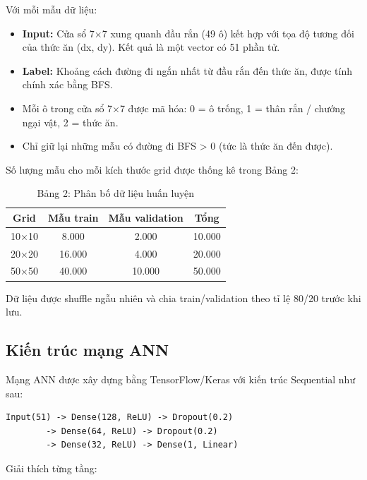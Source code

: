\documentclass[12pt,a4paper]{article}
\begin{document}
Với mỗi mẫu dữ liệu:

\begin{itemize}
    \item \textbf{Input:} Cửa sổ 7×7 xung quanh đầu rắn (49 ô) kết hợp với tọa độ tương đối của thức ăn (dx, dy). Kết quả là một vector có 51 phần tử.
    \item \textbf{Label:} Khoảng cách đường đi ngắn nhất từ đầu rắn đến thức ăn, được tính chính xác bằng BFS.
    \item Mỗi ô trong cửa sổ 7×7 được mã hóa: 0 = ô trống, 1 = thân rắn / chướng ngại vật, 2 = thức ăn.
    \item Chỉ giữ lại những mẫu có đường đi BFS > 0 (tức là thức ăn đến được).
\end{itemize}

Số lượng mẫu cho mỗi kích thước grid được thống kê trong Bảng 2:

\begin{table}[ht]
\centering
\begin{tabular}{|c|c|c|c|}
\hline
\textbf{Grid} & \textbf{Mẫu train} & \textbf{Mẫu validation} & \textbf{Tổng} \\
\hline
10×10  & 8.000  & 2.000  & 10.000 \\
20×20  & 16.000 & 4.000  & 20.000 \\
50×50  & 40.000 & 10.000 & 50.000 \\
\hline
\end{tabular}
\caption{Bảng 2: Phân bố dữ liệu huấn luyện}
\label{tab:data}
\end{table}

Dữ liệu được shuffle ngẫu nhiên và chia train/validation theo tỉ lệ 80/20 trước khi lưu.

\subsection{Kiến trúc mạng ANN}

Mạng ANN được xây dựng bằng TensorFlow/Keras với kiến trúc Sequential như sau:

\begin{verbatim}
Input(51) -> Dense(128, ReLU) -> Dropout(0.2)
        -> Dense(64, ReLU) -> Dropout(0.2)
        -> Dense(32, ReLU) -> Dense(1, Linear)
\end{verbatim}

Giải thích từng tầng:
\end{document}
